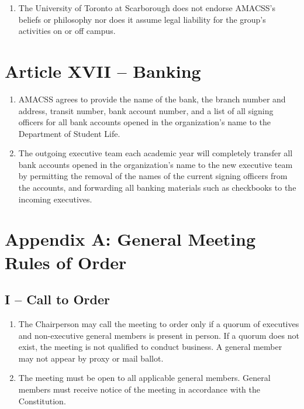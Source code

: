 \documentclass[12pt,a4paper]{article}
\begin{document}
\begin{enumerate}
\item The University of Toronto at Scarborough does not endorse AMACSS's beliefs or philosophy nor does it assume legal liability for the group's activities on or off campus.
\end{enumerate}

\section*{Article XVII – Banking}

\begin{enumerate}
\item AMACSS agrees to provide the name of the bank, the branch number and address, transit number, bank account number, and a list of all signing officers for all bank accounts opened in the organization's name to the Department of Student Life.

\item The outgoing executive team each academic year will completely transfer all bank accounts opened in the organization's name to the new executive team by permitting the removal of the names of the current signing officers from the accounts, and forwarding all banking materials such as checkbooks to the incoming executives.
\end{enumerate}

\section*{Appendix A: General Meeting Rules of Order}

\subsection*{I – Call to Order}

\begin{enumerate}
\item The Chairperson may call the meeting to order only if a quorum of executives and non-executive general members is present in person. If a quorum does not exist, the meeting is not qualified to conduct business. A general member may not appear by proxy
or mail ballot.

\item The meeting must be open to all applicable general members. General members must receive notice of the meeting in accordance with the Constitution.
\end{enumerate}
\end{document}
